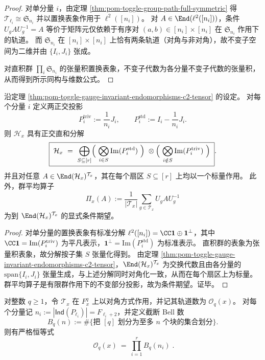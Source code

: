 \begin{proof}
对单分量 \(i\)，由定理 \ref{thm:pom-toggle-group-path-full-symmetric} 得 \(\mathcal T_{\ell_i}\cong \mathfrak S_{n_i}\) 并以置换表象作用于 \(\ell^2([n_i])\)。
对 \(A\in\End(\ell^2([n_i]))\)，条件 \(U_gAU_g^{-1}=A\) 等价于矩阵元仅依赖于有序对 \((a,b)\in [n_i]\times[n_i]\) 在 \(\mathfrak S_{n_i}\) 作用下的轨道。
而 \(\mathfrak S_{n_i}\) 在 \([n_i]\times[n_i]\) 上恰有两条轨道（对角与非对角），故不变子空间为二维并由 \(\{I_i,J_i\}\) 张成。
\par
对直积群 \(\prod_i \mathfrak S_{n_i}\) 的张量积置换表象，不变子代数为各分量不变子代数的张量积，从而得到所示同构与维数公式。
\end{proof}

\begin{corollary}\label{cor:pom-toggle-gauge-sector-decomposition-projections}
沿定理 \ref{thm:pom-toggle-gauge-invariant-endomorphisms-c2-tensor} 的设定。
对每个分量 \(i\) 定义两正交投影
\[
P_i^{\mathrm{triv}}:=\frac{1}{n_i}J_i,
\qquad
P_i^{\mathrm{std}}:=I_i-\frac{1}{n_i}J_i.
\]
则 \(\mathcal H_x\) 具有正交直和分解
\[
\boxed{\;
\mathcal H_x
\ =\ \bigoplus_{S\subseteq [r]}
\Bigl(\ \bigotimes_{i\in S}\mathrm{Im}(P_i^{\mathrm{std}})\ \Bigr)\ \otimes
\Bigl(\ \bigotimes_{i\notin S}\mathrm{Im}(P_i^{\mathrm{triv}})\ \Bigr)\; }.
\]
并且对任意 \(A\in \End(\mathcal H_x)^{\mathcal T_x}\)，其在每个扇区 \(S\subseteq [r]\) 上均以一个标量作用。
此外，群平均算子
\[
\Pi_x(A):=\frac{1}{|\mathcal T_x|}\sum_{g\in\mathcal T_x}U_gAU_g^{-1}
\]
为到 \(\End(\mathcal H_x)^{\mathcal T_x}\) 的显式条件期望。
\end{corollary}

\begin{proof}
对单分量的置换表象有标准分解
\(
\ell^2([n_i])=\CC\mathbf 1\oplus \mathbf 1^\perp
\)，其中 \(\CC\mathbf 1=\mathrm{Im}(P_i^{\mathrm{triv}})\) 为平凡表示，\(\mathbf 1^\perp=\mathrm{Im}(P_i^{\mathrm{std}})\) 为标准表示。
直积群的表象为张量积表象，故分解按子集 \(S\) 张量化得到。
由定理 \ref{thm:pom-toggle-gauge-invariant-endomorphisms-c2-tensor}，\(\End(\mathcal H_x)^{\mathcal T_x}\) 为交换代数且由各分量的 \(\mathrm{span}\{I_i,J_i\}\) 张量生成，与上述分解同时对角化一致，从而在每个扇区上为标量。
群平均算子是有限群作用下的不变部分投影，故为条件期望。证毕。
\end{proof}

\begin{proposition}\label{prop:pom-toggle-orbit-count-bell-product}
对整数 \(q\ge 1\)，令 \(\mathcal T_x\) 在 \(F_x^q\) 上以对角方式作用，并记其轨道数为 \(\mathcal O_q(x)\)。
对每个分量记 \(n_i:=|\mathsf{Ind}(P_{\ell_i})|=F_{\ell_i+2}\)，并定义截断 Bell 数
\[
B_q(n):=\#\{\text{把 }[q]\text{ 划分为至多 }n\text{ 个块的集合划分}\}.
\]
则有严格恒等式
\[
\boxed{\;
\mathcal O_q(x)\ =\ \prod_{i=1}^r B_q(n_i)\; }.
\]
\end{proposition}

